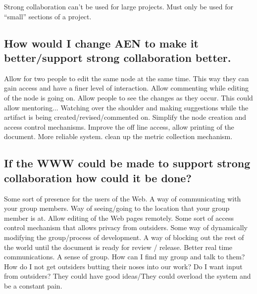 Strong collaboration can't be used for large projects.  Must only be used
for ``small'' sections of a project.


\subsection{How would I change AEN to make it better/support strong
collaboration better.}

Allow for two people to edit the same node at the same time.  This way they
can gain access and have a finer level of interaction.  Allow commenting
while editing of the node is going on.  Allow people to see the changes as
they occur.  This could allow mentoring...  Watching over the shoulder and
making suggestions while the artifact is being created/revised/commented
on.  Simplify the node creation and access control mechanisms.  Improve the
off line access, allow printing of the document.  More reliable system.
clean up the metric collection mechanism.  

\subsection{If the WWW could be made to support strong collaboration how
could it be done?}

Some sort of presence for the users of the Web.  A way of communicating
with your group members.  Way of seeing/going to the location that your
group member is at.  Allow editing of the Web pages remotely.  Some sort of
access control mechanism that allows privacy from outsiders.  Some way of
dynamically modifying the group/process of development.  A way of blocking
out the rest of the world until the document is ready for review / release.
Better real time communications.  A sense of group. How can I find my group
and talk to them?  How do I not get outsiders butting their noses into our
work?  Do I want input from outsiders?  They could have good ideas/They
could overload the system and be a constant pain.

